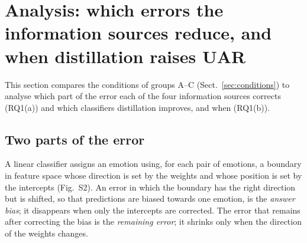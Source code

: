 \FloatBarrier
\section{Analysis: which errors the information sources reduce, and when distillation raises UAR}\label{sec:analysis}

This section compares the conditions of groups A--C (Sect.~\ref{sec:conditions}) to analyse which part of the error each of the four information sources corrects (RQ1(a)) and which classifiers distillation improves, and when (RQ1(b)).

\subsection{Two parts of the error}\label{sec:twoerrors}
A linear classifier assigns an emotion using, for each pair of emotions, a boundary in feature space whose direction is set by the weights and whose position is set by the intercepts (Fig.~S2). An error in which the boundary has the right direction but is shifted, so that predictions are biased towards one emotion, is the \emph{answer bias}; it disappears when only the intercepts are corrected. The error that remains after correcting the bias is the \emph{remaining error}; it shrinks only when the direction of the weights changes.

